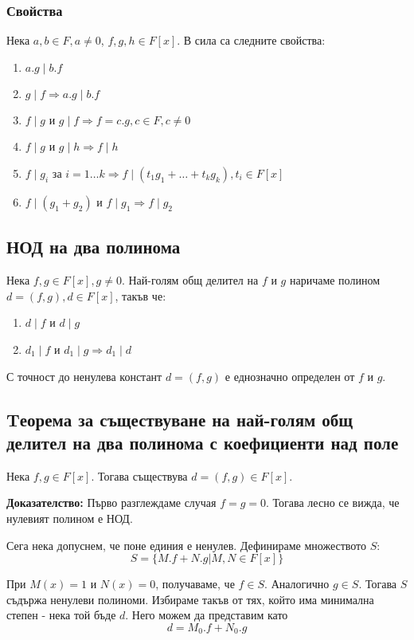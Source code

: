 \documentclass[fleqn,12pt]{article}
\begin{document}
\subsubsection{Свойства}
Нека $a,b \in F, a \neq 0$, $f,g,h \in F[x]$. В сила са следните свойства:
\begin{enumerate}
    \item $a.g \mid b.f$
    \item $g \mid f \Rightarrow a.g \mid b.f$
    \item \label{div_prop:mutual_div} $f \mid g$ и $g \mid f \Rightarrow f = c.g, c \in F, c\neq 0$
    \item $f \mid g$ и $g \mid h \Rightarrow f \mid h$
    \item $f \mid g_i$ за $i = 1 \dots k \Rightarrow f \mid (t_1 g_1 + \dots + t_k g_k), t_i \in F[x]$
    \item \label{div_prop:sum} $f \mid (g_1 + g_2)$ и $f \mid g_1 \Rightarrow f \mid g_2$ 
\end{enumerate} 

\subsection{НОД на два полинома}
Нека $f,g \in F[x], g \neq 0$. Най-голям общ делител на $f$ и $g$ наричаме 
полином $d = (f,g), d \in F[x]$, такъв че:
\begin{enumerate}
    \item $d \mid f$ и $d \mid g$
    \item $d_1 \mid f$ и $d_1 \mid g \Rightarrow d_1 \mid d$
\end{enumerate}

С точност до ненулева констант $d=(f,g)$ е еднозначно определен от $f$ и $g$.

\subsection{Tеорема за съществуване на най-голям общ делител на два полинома с коефициенти над поле}
\label{sec:gcd_exist}
Нека $f,g \in F[x]$. Тогава съществува $d=(f,g) \in F[x]$.

\textbf{Доказателство: } Първо разглеждаме случая $f = g = 0$. Тогава лесно се вижда, че нулевият полином е НОД.

Сега нека допуснем, че поне единия е ненулев. Дефинираме множеството $S$:
\[ S = \{ M.f + N.g | M,N \in F[x] \} \]

При $M(x) = 1$ и $N(x) = 0$, получаваме, че $f \in S$. Аналогично $g \in S$. 
Тогава $S$ съдържа ненулеви полиноми. Избираме такъв от тях, който има минимална степен
 - нека той бъде $d$. Него можем да представим като
\[ d = M_0.f + N_0.g \]
\end{document}
